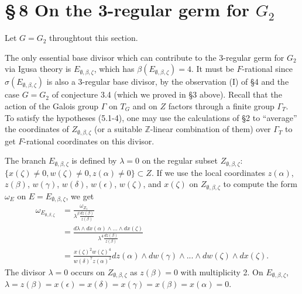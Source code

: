\documentclass[12pt,letterpaper]{amsart}
\newcommand{\eps}{\epsilon}
\begin{document}
\section*{\S\,8 On the 3-regular germ for $G_2$}

Let $G=G_2$ throughtout this section.

The only essential
base divisor which can contribute to the 3-regular
germ for $G_2$ via Igusa theory is $E_{\emptyset,\beta,\zeta}$,
which has $\beta(E_{\emptyset,\beta,\zeta})=4$.
It must be $F$-rational since $\sigma(E_{\emptyset,\beta,\zeta})$
is also a $3$-regular base divisor, by the observation (I) of \S 4
and the case $G=G_2$ of conjecture 3.4 (which we proved in \S 3
above).
Recall that the action of the Galois
group $\Gamma$ on $T_G$ and on $Z$ factors through a finite group
$\Gamma_T$.
To satisfy the hypotheses (5.1-4), one may use
the calculations of \S 2 to ``average'' the coordinates of
$Z_{\emptyset,\beta,\zeta}$
(or a suitable ${\mathbb Z}$-linear combination of them)
over $\Gamma_T$ to get $F$-rational coordinates on this divisor.

The branch $E_{\emptyset,\beta,\zeta}$ is defined by
$\lambda =0$ on the regular subset $Z_{\emptyset,\beta,\zeta}$:
$\{x(\zeta)\not= 0,w(\zeta)\not= 0,z(\alpha)\not= 0\}\subset Z$.
If we use the local coordinates
$z(\alpha)$, $z(\beta)$, $w(\gamma)$, $w(\delta)$,
$w(\eps)$, $w(\zeta)$, and $x(\zeta)$ on
$Z_{\emptyset,\beta,\zeta}$ to compute the form
$\omega_{E}$ on $E=E_{\emptyset,\beta,\zeta}$, we get
\[
\begin{split}
\omega_{E_{\emptyset,\beta,\zeta}}
&=\frac{\omega_{{Z}_1}}{\lambda^\beta \frac{dz(\beta)}{z(\beta)}}\\
&=\frac{{d\lambda \wedge dx(\alpha) \wedge ...\wedge dx(\zeta)}}{\lambda^4 \frac{dz(\beta)}{z(\beta)}}\\
&= \frac{{x(\zeta)^2w(\zeta)^4}}{w(\delta)^7z(\alpha)^2}
dz(\alpha)\wedge dw(\gamma)\wedge ...\wedge dw(\zeta)\wedge dx(\zeta).
\end{split}
\tag{8.1}
\]
The divisor $\lambda =0$ occurs on
$Z_{\emptyset,\beta,\zeta}$ as $z(\beta)=0$ with multiplicity 2.
On $E_{\emptyset,\beta,\zeta}$, $\lambda =z(\beta)=x(\epsilon)=x(\delta)=
x(\gamma)=x(\beta)=x(\alpha)=0$.
\end{document}
